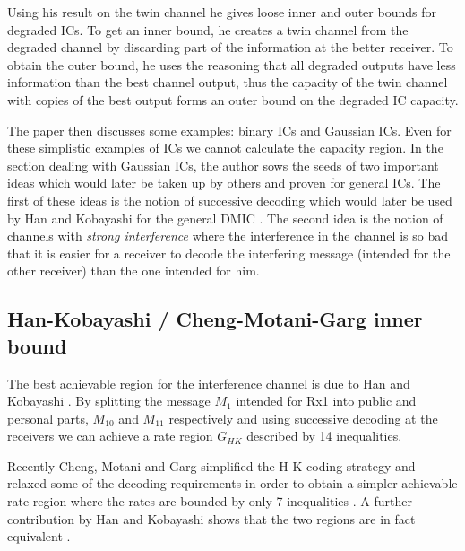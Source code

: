 \documentclass[aps,11pt,twoside,letterpaper]{article}
\begin{document}
            Using his result on the twin channel he gives loose inner and outer bounds for  
            degraded ICs. To get an inner bound, he creates a twin channel from the 
            degraded channel by discarding part of the information at the better receiver.
            To obtain the outer bound, he uses the reasoning that all degraded outputs
            have less information than the best channel output, thus the capacity of the
            twin channel with copies of the best output forms an outer bound on the degraded IC capacity.
            
            The paper then discusses some examples: binary ICs and Gaussian ICs.
            Even for these simplistic examples of ICs we cannot calculate the capacity region.
            In the section dealing with Gaussian ICs, the author sows the seeds of two
            important ideas which would later be taken up by others and proven for general ICs.
            The first of these ideas is the notion of successive decoding which would 
            later be used by Han and Kobayashi for the general DMIC \cite{HK81}.
            The second idea is the notion of channels with \emph{strong interference} where the 
            interference in the channel is so bad that it is easier for a receiver to decode the interfering
            message (intended for the other receiver) than the one intended for him.
            
        
    \subsection{Han-Kobayashi / Cheng-Motani-Garg inner bound}


        The best achievable region for the interference channel is due to Han and Kobayashi \cite{HK81}.
        By splitting the message $M_1$ intended for Rx1 into public and personal parts, 
        $M_{10}$ and $M_{11}$ respectively and using successive  decoding at the receivers
        we can achieve a rate region $G_{HK}$ described by 14 inequalities.
        
        Recently Cheng, Motani and Garg simplified the H-K coding strategy and relaxed some 
        of the decoding requirements in order to obtain a simpler achievable rate region where the rates
        are bounded by only 7 inequalities \cite{CMGE08}.
        A further contribution by Han and Kobayashi shows that the two regions are in fact 
        equivalent \cite{kobayashi2007further}.
        
\end{document}
